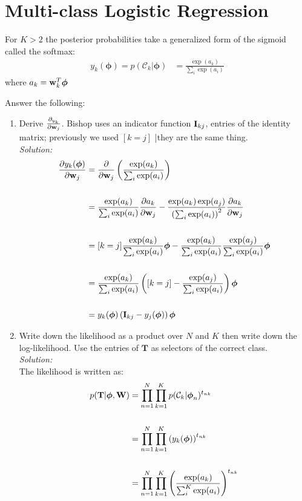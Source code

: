 \documentclass[12pt,a4paper]{article}
\newcommand{\lp}{\left(}
\newcommand{\rp}{\right)}
\newcommand{\eye}{{\bf I}}
\newcommand{\tscalar}{t}
\newcommand{\Tmat}{{\bf \MakeUppercase\tscalar}}
\newcommand{\wscalar}{w}
\newcommand{\wvec}{{\bf \wscalar}}
\newcommand{\Wmat}{{\bf \MakeUppercase\wscalar}}
\newcommand{\phivec}{\boldsymbol{\phi}}
\newcommand{\class}{\mathcal{C}}
\begin{document}
	\vspace{0.25in}
	\section{Multi-class Logistic Regression}
	For $K > 2$ the posterior probabilities take a generalized form of the sigmoid called the softmax:
	\begin{align*}
	y_{k}(\phivec) = p(\class_{k} | \phivec ) &=
	\frac{\exp(a_{k})}{\sum_i \exp(a_{i})}
	\end{align*}
	where $a_{k} = \wvec_{k}^{T} \phivec$
	
	Answer the following:
	\begin{enumerate}
		\item Derive $\frac{\partial_{y_{k}}}{\partial\wvec_j}$. Bishop uses an indicator function $\eye_{kj}$, entries of the identity matrix; previously we used $[k = j]$ |they are the same thing. \\
		\emph{Solution:} \\
		
		\begin{align*}
		\frac{\partial y_k(\phivec)}{\partial \wvec_j} &= \frac{\partial}{\partial \wvec_j} \lp \frac{\exp(a_k)}{\sum_i \exp(a_i)} \rp \\\\
		&= \frac{\exp(a_k)}{\sum_i \exp(a_i)} \frac{\partial a_k}{\partial \wvec_j} - \frac{\exp(a_k) \exp(a_j)}{\lp \sum_i \exp(a_i) \rp^2}  \frac{\partial a_k}{\partial \wvec_j} \\\\
		&= [k = j] \frac{\exp(a_k)}{\sum_i \exp(a_i)} \phivec - \frac{\exp(a_k)}{\sum_i \exp(a_i)} \frac{\exp(a_j)}{\sum_i \exp(a_i)} \phivec \\\\
		&= \frac{\exp(a_k)}{\sum_i \exp(a_i)} \lp [k = j] - \frac{\exp(a_j)}{\sum_i \exp(a_i)} \rp \phivec \\\\
		&= y_k(\phivec) \lp \eye_{kj} - y_j(\phivec) \rp \phivec
		\end{align*}		  
		
		\item Write down the likelihood as a product over $N$ and $K$ then write down the log-likelihood. Use the entries of $\textbf{T}$ as selectors of the correct class. \\
		\emph{Solution:} \\
		The likelihood is written as:
		\begin{align*}
		p(\Tmat | \phivec, \Wmat) &= \prod_{n=1}^N \prod_{k=1}^K p(\class_k | \phivec_n)^{t_{nk}} \\\\
		&= \prod_{n=1}^N \prod_{k=1}^K \lp y_k(\phivec) \rp^{t_{nk}} \\\\
		&= \prod_{n=1}^N \prod_{k=1}^K \lp \frac{\exp(a_k)}{\sum_i^K \exp(a_i)} \rp^{t_{nk}} 
		\end{align*}
		

\end{enumerate}
\end{document}
